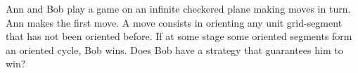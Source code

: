 Ann and Bob play a game on an infinite checkered plane making moves in turn. Ann makes the first move. A move consists in orienting any unit grid-segment that has not been oriented before. If at some stage some oriented segments form an oriented cycle, Bob wins. Does Bob have a strategy that guarantees him to win?